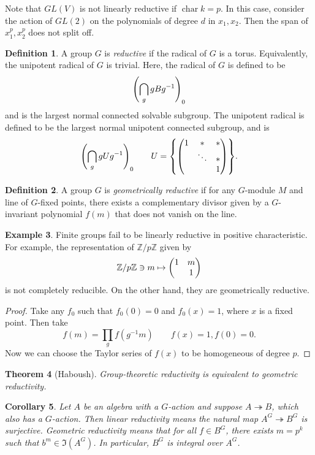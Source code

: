 \documentclass[leqno, openany]{memoir}
\newtheorem{thm}{Theorem}[section]
\newtheorem{cor}[thm]{Corollary}
\theoremstyle{definition}
\newtheorem{defn}[thm]{Definition}
\newtheorem{exm}[thm]{Example}
\theoremstyle{remark}
\theoremstyle{plain}
\theoremstyle{definition}
\theoremstyle{remark}
\newcommand{\Z}{\mathbb{Z}}
\begin{document}
Note that $GL(V)$ is not linearly reductive if $\operatorname{char} k = p$. In
this case, consider the action of $GL(2)$ on the polynomials of degree $d$ in
$x_1, x_2$. Then the span of $x_1^p, x_2^p$ does not split off.

\begin{defn} A group $G$ is \textit{reductive} if the radical of $G$ is a
    torus. Equivalently, the unipotent radical of $G$ is trivial. Here, the
    radical of $G$ is defined to be \[ {\qty(\bigcap_g g B g^{-1})}_0 \] and is
    the largest normal connected solvable subgroup. The unipotent radical is
    defined to be the largest normal unipotent connected subgroup, and is \[
    {\qty(\bigcap_g g U g^{-1})}_0 \qquad U = \qty{ \mqty(1 & * & * \\ & \ddots
                                                            & * \\ & & 1) }. \]
    \end{defn}

\begin{defn} A group $G$ is \textit{geometrically reductive} if for any
$G$-module $M$ and line of $G$-fixed points, there exists a complementary
divisor given by a $G$-invariant polynomial $f(m)$ that does not vanish on the
line.  \end{defn}

\begin{exm} Finite groups fail to be linearly reductive in positive
    characteristic. For example, the representation of $\Z/p\Z$ given by \[
    \Z/p\Z \ni m \mapsto \mqty(1 & m \\ & 1) \] is not completely reducible. On
    the other hand, they are geometrically reductive.  \end{exm}

\begin{proof} Take any $f_0$ such that $f_0(0) = 0$ and $f_0(x) = 1$, where $x$
    is a fixed point. Then take \[ f(m) = \prod_g f(g^{-1}m) \qquad f(x) = 1,
    f(0) = 0. \] Now we can choose the Taylor series of $f(x)$ to be
    homogeneous of degree $p$.  \end{proof}

\begin{thm}[Haboush] Group-theoretic reductivity is equivalent to geometric
reductivity.  \end{thm}

\begin{cor} Let $A$ be an algebra with a $G$-action and suppose $A
    \twoheadrightarrow B$, which also has a $G$-action. Then linear reductivity
    means the natural map $A^G \twoheadrightarrow B^G$ is surjective. Geometric
    reductivity means that for all $f \in B^G$, there exists $m = p^k$ such
    that $b^m \in \Im(A^G)$. In particular, $B^G$ is integral over $A^G$.
\end{cor}
\end{document}
